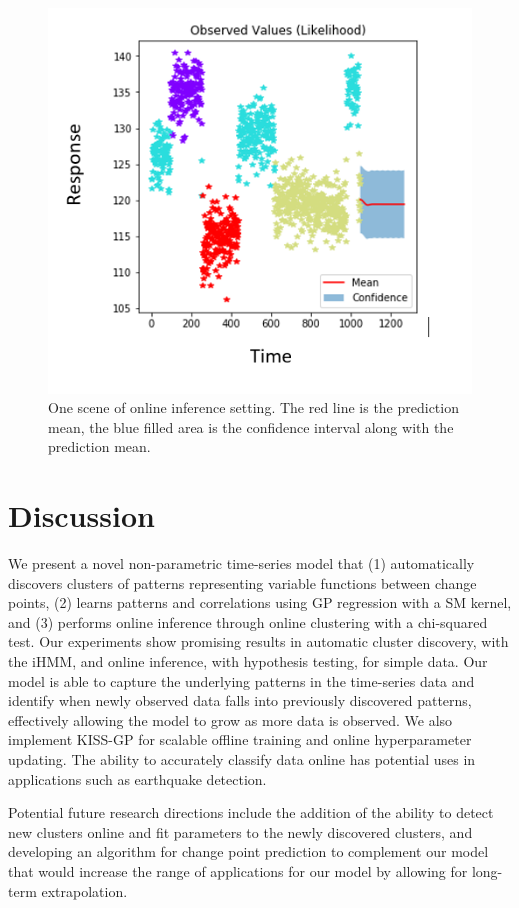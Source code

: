 \documentclass{article}
\begin{document}
\begin{figure}[ht]
	\vskip 0.2in
	\begin{center}
		\centerline{\includegraphics[width=\columnwidth]{kissgp}}
		\caption{	
	One scene of online inference setting. The red line is the prediction mean, the blue filled area is the confidence interval along with the prediction mean.}
		\label{kissgp}
	\end{center}
	\vskip -0.2in
\end{figure}


\section{Discussion}

We present a novel non-parametric time-series model that (1) automatically discovers clusters of patterns representing variable functions between change points, (2) learns patterns and correlations using GP regression with a SM kernel, and (3) performs online inference through online clustering with a chi-squared test. Our experiments show promising results in automatic cluster discovery, with the iHMM, and online inference, with hypothesis testing, for simple data. Our model is able to capture the underlying patterns in the time-series data and identify when newly observed data falls into previously discovered patterns, effectively allowing the model to grow as more data is observed. We also implement KISS-GP for scalable offline training and online hyperparameter updating. The ability to accurately classify data online has potential uses in applications such as earthquake detection.

Potential future research directions include the addition of the ability to detect new clusters online and fit parameters to the newly discovered clusters, and developing an algorithm for change point prediction to complement our model that would increase the range of applications for our model by allowing for long-term extrapolation.



\end{document}
